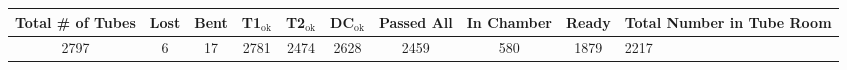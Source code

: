 \begin{tabular}{|c|c|c|c|c|c|c|c|c|p{2.5cm}|}
\hline
 Total \# of Tubes &  Lost &  Bent &  T1$_\text{ok}$ &  T2$_\text{ok}$ &  DC$_\text{ok}$ &  Passed All &  In Chamber &  Ready &  Total Number in Tube Room \\\hline

              2797 &     6 &    17 &            2781 &            2474 &            2628 &        2459 &         580 &   1879 &                       2217 \\\hline

\end{tabular}
